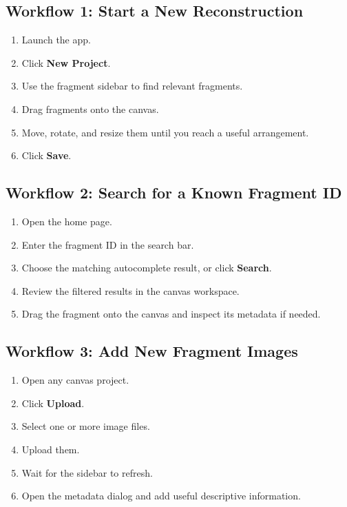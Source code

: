 \documentclass[12pt]{article}
\begin{document}
\subsection{Workflow 1: Start a New Reconstruction}
\begin{enumerate}
  \item Launch the app.
  \item Click \textbf{New Project}.
  \item Use the fragment sidebar to find relevant fragments.
  \item Drag fragments onto the canvas.
  \item Move, rotate, and resize them until you reach a useful arrangement.
  \item Click \textbf{Save}.
\end{enumerate}

\subsection{Workflow 2: Search for a Known Fragment ID}
\begin{enumerate}
  \item Open the home page.
  \item Enter the fragment ID in the search bar.
  \item Choose the matching autocomplete result, or click \textbf{Search}.
  \item Review the filtered results in the canvas workspace.
  \item Drag the fragment onto the canvas and inspect its metadata if needed.
\end{enumerate}

\subsection{Workflow 3: Add New Fragment Images}
\begin{enumerate}
  \item Open any canvas project.
  \item Click \textbf{Upload}.
  \item Select one or more image files.
  \item Upload them.
  \item Wait for the sidebar to refresh.
  \item Open the metadata dialog and add useful descriptive information.
\end{enumerate}
\end{document}
